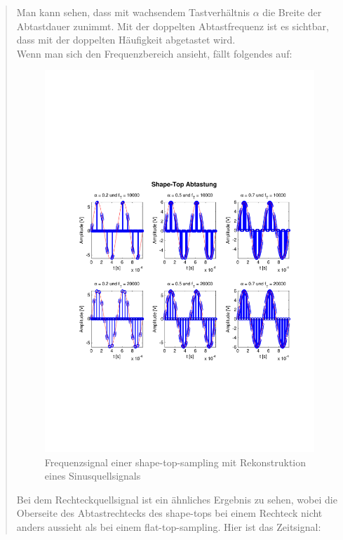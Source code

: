 \begin{quote}
  	    Man kann sehen, dass mit wachsendem Tastverhältnis $\alpha$ die Breite
  	    der Abtastdauer zunimmt. Mit der doppelten Abtastfrequenz ist es
  	    sichtbar, dass mit der doppelten Häufigkeit abgetastet wird.\\
  	    Wenn man sich den Frequenzbereich ansieht, fällt folgendes auf:
  	    
  	    
    	\begin{figure}[H]
    \centering
        \includegraphics[scale=0.7, trim = 0cm 0cm 0cm 0cm,
        clip]{./Bilder/shape-top-zeit_3V}
            \caption{Frequenzsignal einer shape-top-sampling mit Rekonstruktion
            eines Sinusquellsignals}
  	    \end{figure}
  	    
    
    	Bei dem Rechteckquellsignal ist ein ähnliches Ergebnis zu sehen, wobei die
    	Oberseite des Abtastrechtecks des shape-tops bei einem Rechteck nicht
    	anders aussieht als bei einem flat-top-sampling. Hier ist das Zeitsignal:
    	

\end{quote}
